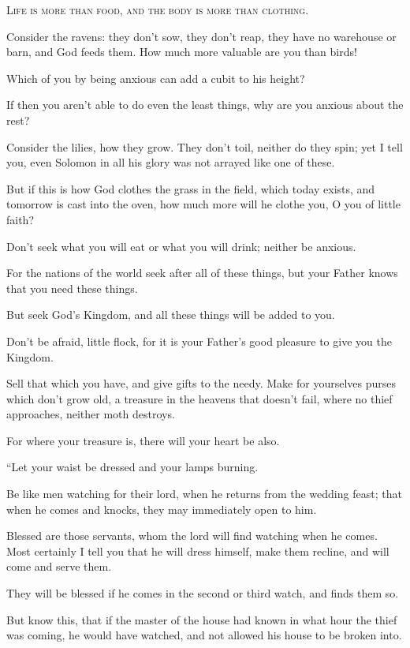 \lettrine{L}{ife is more than food, and the body is more than clothing.}

Consider the ravens: they don’t sow, they don’t reap, they have no warehouse or barn, and God feeds them. How much more valuable are you than birds!

Which of you by being anxious can add a cubit to his height?

If then you aren’t able to do even the least things, why are you anxious about the rest?

Consider the lilies, how they grow. They don’t toil, neither do they spin; yet I tell you, even Solomon in all his glory was not arrayed like one of these.

But if this is how God clothes the grass in the field, which today exists, and tomorrow is cast into the oven, how much more will he clothe you, O you of little faith?

Don’t seek what you will eat or what you will drink; neither be anxious.

For the nations of the world seek after all of these things, but your Father knows that you need these things.

But seek God’s Kingdom, and all these things will be added to you.

Don’t be afraid, little flock, for it is your Father’s good pleasure to give you the Kingdom.

Sell that which you have, and give gifts to the needy. Make for yourselves purses which don’t grow old, a treasure in the heavens that doesn’t fail, where no thief approaches, neither moth destroys.

For where your treasure is, there will your heart be also.

“Let your waist be dressed and your lamps burning.

Be like men watching for their lord, when he returns from the wedding feast; that when he comes and knocks, they may immediately open to him.

Blessed are those servants, whom the lord will find watching when he comes. Most certainly I tell you that he will dress himself, make them recline, and will come and serve them.

They will be blessed if he comes in the second or third watch, and finds them so.

But know this, that if the master of the house had known in what hour the thief was coming, he would have watched, and not allowed his house to be broken into.

